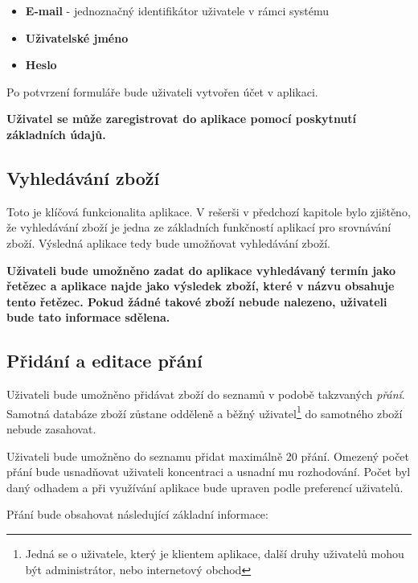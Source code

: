\begin{itemize}
\item \textbf{E-mail} - jednoznačný identifikátor uživatele v rámci systému
\item \textbf{Uživatelské jméno}
\item \textbf{Heslo}
\end{itemize}

Po potvrzení formuláře bude uživateli vytvořen účet v aplikaci.

\textbf{Uživatel se může zaregistrovat do aplikace pomocí poskytnutí základních údajů.} 

\subsection{Vyhledávání zboží}
\label{sec:vyhledavani}
Toto je klíčová funkcionalita aplikace. V rešerši v předchozí kapitole bylo zjištěno, že vyhledávání zboží je jedna ze základních funkčností aplikací pro srovnávání zboží. Výsledná aplikace tedy bude umožňovat vyhledávání zboží.

\textbf{Uživateli bude umožněno zadat do aplikace vyhledávaný termín jako řetězec a aplikace najde jako výsledek zboží, které v názvu obsahuje tento řetězec. Pokud žádné takové zboží nebude nalezeno, uživateli bude tato informace sdělena.}%

\subsection{Přidání a editace přání}
\label{sec:pridani-prani}
Uživateli bude umožněno přidávat zboží do seznamů v podobě takzvaných \emph{přání}. Samotná databáze zboží zůstane odděleně a běžný uživatel\footnote{Jedná se o uživatele, který je klientem aplikace, další druhy uživatelů mohou být administrátor, nebo internetový obchod} do samotného zboží nebude zasahovat.

Uživateli bude umožněno do seznamu přidat maximálně 20 přání. Omezený počet přání bude usnadňovat uživateli koncentraci a usnadní mu rozhodování\cite{iyengar2004much}. Počet byl daný odhadem a při využívání aplikace bude upraven podle preferencí uživatelů.

Přání bude obsahovat následující základní informace:

